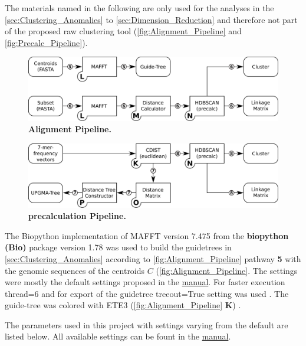 The materials named in the following are only used for the analyses in the \autoref{sec:Clustering_Anomalies} to \autoref{sec:Dimension_Reduction} and therefore not part of the proposed raw clustering tool (\autoref{fig:Alignment_Pipeline} and \autoref{fig:Precalc_Pipeline}).

\begin{figure}[!hbt]
    \centering
    \includegraphics[width=\textwidth]{Graphics/Alignment.pdf}
    \caption[Alignment Pipeline]{\textbf{Alignment Pipeline.} }
    \label{fig:Alignment_Pipeline}
\end{figure}

\begin{figure}[!hbt]
    \centering
    \includegraphics[width=\textwidth]{Graphics/Precalculated.pdf}
    \caption[Precalculation Pipeline]{\textbf{precalculation Pipeline.} }
    \label{fig:Precalc_Pipeline}
\end{figure}

The Biopython implementation of MAFFT version 7.475 from the \textbf{biopython (Bio)} package version 1.78 was used to build the guidetrees in \autoref{sec:Clustering_Anomalies} according to \autoref{fig:Alignment_Pipeline} pathway \textsf{\textbf{5}} with the genomic sequences of the centroids $C$ \autocite{katoh_mafft_2013, cock_biopython_2009} (\autoref{fig:Alignment_Pipeline}. The settings were mostly the default settings proposed in the \href{https://mafft.cbrc.jp/alignment/software/}{manual}. For faster execution \colorbox{backcolour}{thread=6} and for export of the guidetree \colorbox{backcolour}{treeout=True} setting was used \autocite{katoh_mafft_2013, cock_biopython_2009}. The guide-tree was colored with ETE3 (\autoref{fig:Alignment_Pipeline} \textsf{\textbf{K}}) \autocite{huerta-cepas_ete_2016}.

The parameters used in this project with settings varying from the default are listed below. All available settings can be fount in the \href{https://mafft.cbrc.jp/alignment/software/}{manual}.

